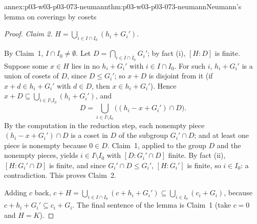 \begin{annexitem}{annex:p03-w03-p03-073-neumann}{thm:p03-w03-p03-073-neumann}{Neumann's lemma on coverings by cosets}
\begin{proof}
\emph{Claim 2.} \(H=\bigcup_{i\in I\cap I_0}(h_i+G_i')\).

By Claim~1, \(I\cap I_0\neq\emptyset\). Let
\(D=\bigcap_{i\in I\cap I_0}G_i'\); by fact (i), \([H:D]\) is finite.
Suppose some \(x\in H\) lies in no \(h_i+G_i'\) with \(i\in I\cap I_0\).
For such \(i\), \(h_i+G_i'\) is a union of cosets of \(D\), since
\(D\le G_i'\); so \(x+D\) is disjoint from it (if \(x+d\in h_i+G_i'\) with
\(d\in D\), then \(x\in h_i+G_i'\)). Hence
\(x+D\subseteq\bigcup_{i\in I\setminus I_0}(h_i+G_i')\), and
\[
 D=\bigcup_{i\in I\setminus I_0}\bigl((h_i-x+G_i')\cap D\bigr).
\]
By the computation in the reduction step, each nonempty piece
\((h_i-x+G_i')\cap D\) is a coset in \(D\) of the subgroup
\(G_i'\cap D\); and at least one piece is nonempty because \(0\in D\).
Claim~1, applied to the group \(D\) and the nonempty pieces, yields
\(i\in I\setminus I_0\) with \([D:G_i'\cap D]\) finite. By fact (ii),
\([H:G_i'\cap D]\) is finite, and since \(G_i'\cap D\le G_i'\),
\([H:G_i']\) is finite, so \(i\in I_0\): a contradiction. This proves
Claim~2.

Adding \(c\) back, \(c+H=\bigcup_{i\in I\cap I_0}(c+h_i+G_i')\subseteq
\bigcup_{i\in I_0}(c_i+G_i)\), because \(c+h_i+G_i'\subseteq c_i+G_i\). The
final sentence of the lemma is Claim~1 (take \(c=0\) and \(H=K\)).
\end{proof}
\end{annexitem}

